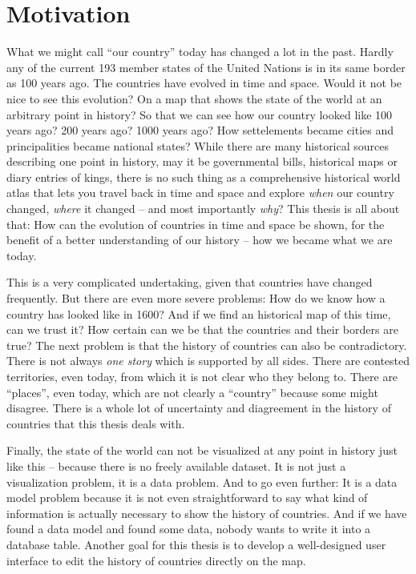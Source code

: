 \section{Motivation} %
\label{sec:motivation}

What we might call ``our country'' today has changed a lot in the past. Hardly any of the current 193 member states of the United Nations is in its same border as 100 years ago. The countries have evolved in time and space. Would it not be nice to see this evolution? On a map that shows the state of the world at an arbitrary point in history? So that we can see how our country looked like 100 years ago? 200 years ago? 1000 years ago? How settelements became cities and principalities became national states? While there are many historical sources describing one point in history, may it be governmental bills, historical maps or diary entries of kings, there is no such thing as a comprehensive historical world atlas that lets you travel back in time and space and explore \emph{when} our country changed, \emph{where} it changed -- and most importantly \emph{why}? This thesis is all about that: How can the evolution of countries in time and space be shown, for the benefit of a better understanding of our history -- how we became what we are today.

This is a very complicated undertaking, given that countries have changed frequently. But there are even more severe problems: How do we know how a country has looked like in 1600? And if we find an historical map of this time, can we trust it? How certain can we be that the countries and their borders are true? The next problem is that the history of countries can also be contradictory. There is not always \emph{one story} which is supported by all sides. There are contested territories, even today, from which it is not clear who they belong to. There are ``places'', even today, which are not clearly a ``country'' because some might disagree. There is a whole lot of uncertainty and diagreement in the history of countries that this thesis deals with.

Finally, the state of the world can not be visualized at any point in history just like this -- because there is no freely available dataset. It is not just a visualization problem, it is a data problem. And to go even further: It is a data model problem because it is not even straightforward to say what kind of information is actually necessary to show the history of countries. And if we have found a data model and found some data, nobody wants to write it into a database table. Another goal for this thesis is to develop a well-designed user interface to edit the history of countries directly on the map.

